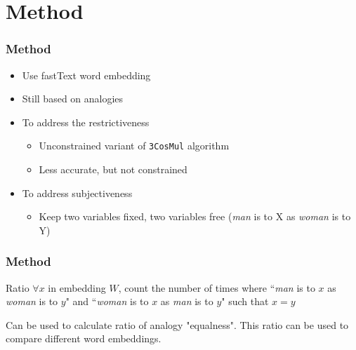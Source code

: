 \documentclass[handout]{beamer}
\begin{document}
\section{Method}
\begin{frame}
\frametitle{Method}
\begin{itemize}
    \item Use fastText word embedding
    \pause
    \item Still based on analogies
    \pause
    \item To address the restrictiveness
    \begin{itemize}
        \item Unconstrained variant of \texttt{3CosMul} algorithm 
        \item Less accurate, but not constrained
    \end{itemize}
    \pause
    \item To address subjectiveness
    \begin{itemize}
        \item Keep two variables fixed, two variables free
            \newline
        (\textit{man} is to X as \textit{woman} is to Y)
    \end{itemize}

\end{itemize}
\end{frame}

\begin{frame}
\frametitle{Method}
\begin{block}{Ratio}
$\forall x$ in embedding $W$, count the number of times where ``\textit{man} is to $x$ as \textit{woman} is to $y$" and ``\textit{woman} is to $x$ as \textit{man} is to $y$" such that $x=y$
\end{block}
Can be used to calculate ratio of analogy "equalness". This ratio can be used to
compare different word embeddings.

\end{frame}
\end{document}
